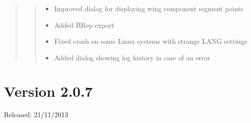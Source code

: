 \documentclass[]{scrartcl}
\begin{document}
\begin{quote}
\begin{itemize}
  \begin{quote}
  \begin{itemize}
  \itemsep1pt\parskip0pt
  \item
    Improved dialog for displaying wing component segment points
  \item
    Added BRep export
  \item
    Fixed crash on some Linux systems with strange LANG settings
  \item
    Added dialog showing log history in case of an error
  \end{itemize}
  \end{quote}
\end{itemize}
\end{quote}

\section{Version 2.0.7}\label{version-2.0.7}

Released: 21/11/2013
\end{document}
